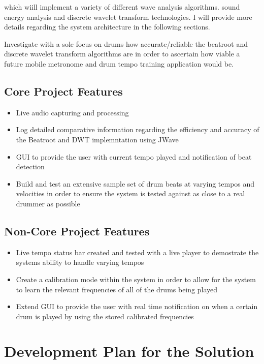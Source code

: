 \documentclass[a4paper, 11pt]{article}
\begin{document}
 which wiill implement a variety of different wave analysis algorithms. sound energy analysis and discrete wavelet transform technologies. I will provide more details regarding the system architecture in the following sections. 

Investigate with a sole focus on drums how accurate/reliable the beatroot and discrete wavelet transform algorithms are in order to ascertain how viable a future mobile metronome and drum tempo training application would be.



\subsection{Core Project Features}
\begin{itemize}
\item Live audio capturing and processing
\item Log detailed comparative information regarding the efficiency and accuracy of the Beatroot and DWT implemntation using JWave
\item GUI to provide the user with current tempo played and notification of beat detection
\item Build and test an extensive sample set of drum beats at varying tempos and velocities in order to ensure the system is tested against as close to a real drummer as possible
\end{itemize}

\subsection{Non-Core Project Features}
\begin{itemize}
\item Live tempo status bar created and tested with a live player to demostrate the systems ability to handle varying tempos
\item Create a calibration mode within the system in order to allow for the system to learn the relevant frequencies of all of the drums being played
\item Extend GUI to provide the user with real time notification on when a certain drum is played by using the stored calibrated frequencies
\end{itemize}

\maketitle{} 
\section{Development Plan for the Solution}
\end{document}
